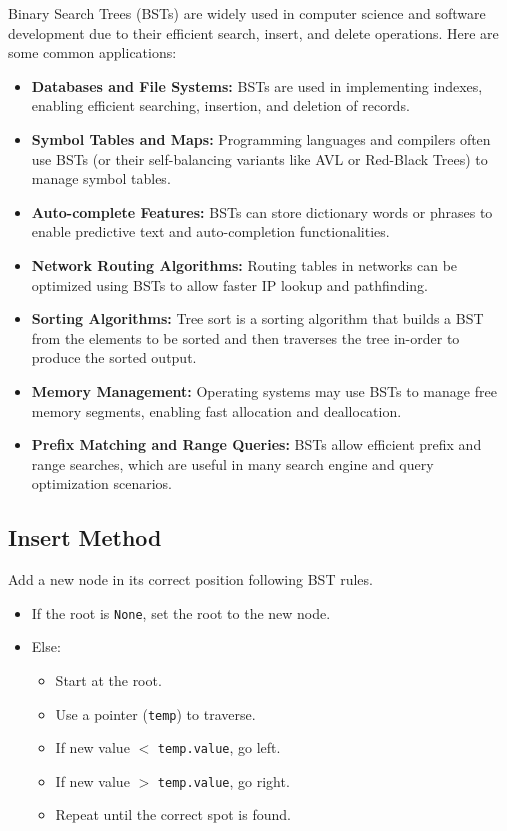 \documentclass{thesisnotes}
\begin{document}
Binary Search Trees (BSTs) are widely used in computer science and software development due to their efficient search, insert, and delete operations. Here are some common applications:

\begin{itemize}
    \item \textbf{Databases and File Systems:} BSTs are used in implementing indexes, enabling efficient searching, insertion, and deletion of records.

    \item \textbf{Symbol Tables and Maps:} Programming languages and compilers often use BSTs (or their self-balancing variants like AVL or Red-Black Trees) to manage symbol tables.

    \item \textbf{Auto-complete Features:} BSTs can store dictionary words or phrases to enable predictive text and auto-completion functionalities.

    \item \textbf{Network Routing Algorithms:} Routing tables in networks can be optimized using BSTs to allow faster IP lookup and pathfinding.

    \item \textbf{Sorting Algorithms:} Tree sort is a sorting algorithm that builds a BST from the elements to be sorted and then traverses the tree in-order to produce the sorted output.

    \item \textbf{Memory Management:} Operating systems may use BSTs to manage free memory segments, enabling fast allocation and deallocation.

    \item \textbf{Prefix Matching and Range Queries:} BSTs allow efficient prefix and range searches, which are useful in many search engine and query optimization scenarios.
\end{itemize}


\subsection{Insert Method}
Add a new node in its correct position following BST rules.
\begin{itemize}
    \item If the root is \texttt{None}, set the root to the new node.
    \item Else:
    \begin{itemize}
        \item Start at the root.
        \item Use a pointer (\texttt{temp}) to traverse.
        \item If new value $<$ \texttt{temp.value}, go left.
        \item If new value $>$ \texttt{temp.value}, go right.
        \item Repeat until the correct spot is found.
    \end{itemize}
\end{itemize}
\end{document}
